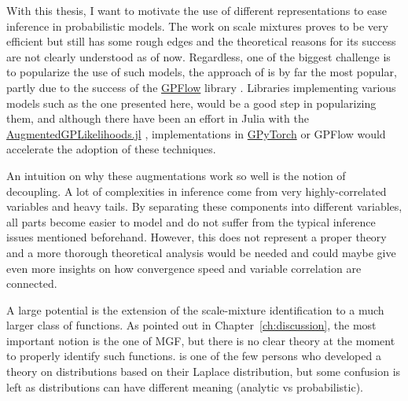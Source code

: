 

\graphicspath{{9_conclusion/figures/}}

With this thesis, I want to motivate the use of different representations to ease inference in probabilistic models.
The work on scale mixtures proves to be very efficient but still has some rough edges and the theoretical reasons for its success are not clearly understood as of now.
Regardless, one of the biggest challenge is to popularize the use of such models, the approach of \citet{Hensman2015} is by far the most popular, partly due to the success of the \href{https://github.com/GPflow/GPflow}{GPFlow} library \cite{GPflow2017}.
Libraries implementing various models such as the one presented here, would be a good step in popularizing them, and although there have been an effort in Julia with the \href{https://github.com/JuliaGaussianProcesses/AugmentedGPLikelihoods.jl}{AugmentedGPLikelihoods.jl} \cite{theo_galy_fajou_2022_6347022}, implementations in \href{https://gpytorch.ai/}{GPyTorch} \cite{gardner2018gpytorch} or GPFlow would accelerate the adoption of these techniques.

An intuition on why these augmentations work so well is the notion of decoupling.
A lot of complexities in inference come from very highly-correlated variables and heavy tails.
By separating these components into different variables, all parts become easier to model and do not suffer from the typical inference issues mentioned beforehand.
However, this does not represent a proper theory and a more thorough theoretical analysis would be needed and could maybe give even more insights on how convergence speed and variable correlation are connected.

A large potential is the extension of the scale-mixture identification to a much larger class of functions.
As pointed out in Chapter~\ref{ch:discussion}, the most important notion is the one of \acl{MGF}, but there is no clear theory at the moment to properly identify such functions.
\citet{schwartz1952transformation} is one of the few persons who developed a theory on distributions based on their Laplace distribution, but some confusion is left as distributions can have different meaning (analytic vs probabilistic).


